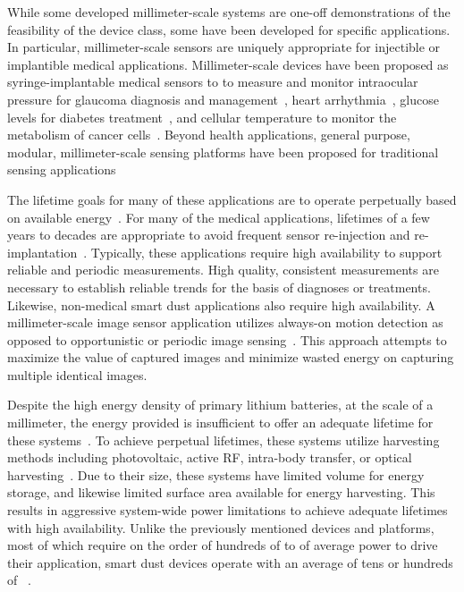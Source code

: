 While some developed millimeter-scale systems are one-off demonstrations of the feasibility of the device class, some have been developed for specific applications.
In particular, millimeter-scale sensors are uniquely appropriate for injectible or implantible medical applications.
Millimeter-scale devices have been proposed as syringe-implantable medical sensors to to measure and monitor 
intraocular pressure for glaucoma diagnosis and management~\cite{ghaed2013circuits},
heart arrhythmia~\cite{chen2014injectable},
glucose levels for diabetes treatment~\cite{nazari2019novel}, and cellular temperature to monitor the metabolism of cancer cells~\cite{wu20180}.
Beyond health applications, general purpose, modular, millimeter-scale sensing platforms have been proposed for traditional sensing applications~\cite{lee2013modular, kim2014millimeter}

The lifetime goals for many of these applications are to operate perpetually based on available energy~\cite{kim2014millimeter, lee2013modular}. For many of the medical applications, lifetimes of a few years to decades are appropriate to avoid frequent sensor re-injection and re-implantation~\cite{chen2014injectable}.
Typically, these applications require high availability to support reliable and periodic measurements.
High quality, consistent measurements are necessary to establish reliable trends for the basis of diagnoses or treatments.
Likewise, non-medical smart dust applications also require high availability.
A millimeter-scale image sensor application utilizes always-on motion detection as opposed to opportunistic or periodic image sensing~\cite{kim2014millimeter}.
This approach attempts to maximize the value of captured images and minimize wasted energy on capturing multiple identical images.

Despite the high energy density of primary lithium batteries, at the scale of a millimeter, the energy provided is insufficient to offer an adequate lifetime for these systems~\cite{lee2013modular}.
To achieve perpetual lifetimes, these systems utilize harvesting methods including photovoltaic, active RF, intra-body transfer, or optical harvesting~\cite{wu20180, lee2013modular, nazari2019novel}.
Due to their size, these systems have limited volume for energy storage, and likewise limited surface area available for energy harvesting.
This results in aggressive system-wide power limitations to achieve adequate lifetimes with high availability.
Unlike the previously mentioned devices and platforms, most of which require on the order of hundreds of \ssi{\micro\watt} to \ssi{\milli\watt} of average power to drive their application, smart dust devices operate with an average of tens or hundreds of \ssi{\nano\watt}~\cite{lee2013modular,kim2014millimeter,chen2014injectable,wu20180}.

